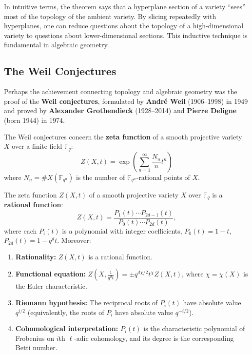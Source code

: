 In intuitive terms, the theorem says that a hyperplane section of a variety ``sees'' most of the topology of the ambient variety. By slicing repeatedly with hyperplanes, one can reduce questions about the topology of a high-dimensional variety to questions about lower-dimensional sections. This inductive technique is fundamental in algebraic geometry.

\subsection{The Weil Conjectures}

Perhaps the achievement connecting topology and algebraic geometry was the proof of the \textbf{Weil conjectures}, formulated by \textbf{Andr\'e Weil} (1906--1998) in 1949 and proved by \textbf{Alexander Grothendieck} (1928--2014) and \textbf{Pierre Deligne} (born 1944) in 1974.

The Weil conjectures concern the \textbf{zeta function} of a smooth projective variety $X$ over a finite field $\mathbb{F}_q$:
\[
    Z(X, t) = \exp\left(\sum_{n=1}^{\infty} \frac{N_n}{n} t^n\right)
\]
where $N_n = \#X(\mathbb{F}_{q^n})$ is the number of $\mathbb{F}_{q^n}$-rational points of $X$.

\begin{theorem}\label{thm:weil-conjectures}
The zeta function $Z(X, t)$ of a smooth projective variety $X$ over $\mathbb{F}_q$ is a \textbf{rational function}:
\[
Z(X, t) = \frac{P_1(t)\cdots P_{2d-1}(t)}{P_0(t)\cdots P_{2d}(t)},
\]
where each $P_i(t)$ is a polynomial with integer coefficients, $P_0(t)=1-t$, $P_{2d}(t)=1-q^d t$. Moreover:
\begin{enumerate}
    \item \textbf{Rationality:} $Z(X, t)$ is a rational function.
    \item \textbf{Functional equation:} $Z\!\left(X,\frac{1}{q^d t}\right)=\pm q^{d\chi/2}t^{\chi}Z(X,t)$, where $\chi=\chi(X)$ is the Euler characteristic.
    \item \textbf{Riemann hypothesis:} The reciprocal roots of $P_i(t)$ have absolute value $q^{i/2}$ (equivalently, the roots of $P_i$ have absolute value $q^{-i/2}$).
    \item \textbf{Cohomological interpretation:} $P_i(t)$ is the characteristic polynomial of Frobenius on $i$th $\ell$-adic cohomology, and its degree is the corresponding Betti number.
\end{enumerate}
\end{theorem}

